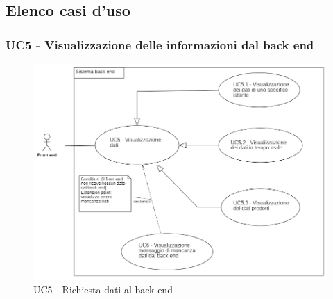 \subsection{Elenco casi d'uso}\label{FBelencoCasiDuso}


\subsubsection{UC5 - Visualizzazione delle informazioni dal back end}\label{richiestaDati}
\begin{center}
	\begin{figure}[H]
		\includegraphics[scale=0.7]{../immagini/attori_casi/uc5_uc51_uc52_uc53.png}
		\caption{UC5 - Richiesta dati al back end}
	\end{figure}
\end{center}
